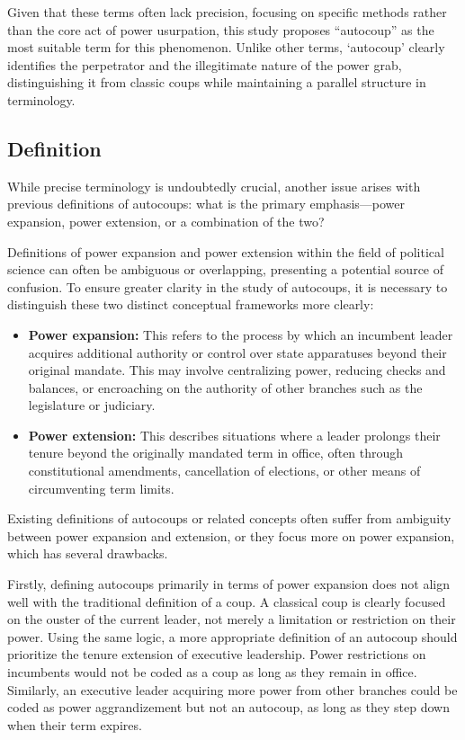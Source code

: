 \documentclass[
  12pt,
]{report}
\begin{document}
Given that these terms often lack precision, focusing on specific
methods rather than the core act of power usurpation, this study
proposes ``autocoup'' as the most suitable term for this phenomenon.
Unlike other terms, `autocoup' clearly identifies the perpetrator and
the illegitimate nature of the power grab, distinguishing it from
classic coups while maintaining a parallel structure in terminology.

\subsection{Definition}\label{definition}

While precise terminology is undoubtedly crucial, another issue arises
with previous definitions of autocoups: what is the primary
emphasis---power expansion, power extension, or a combination of the
two?

Definitions of power expansion and power extension within the field of
political science can often be ambiguous or overlapping, presenting a
potential source of confusion. To ensure greater clarity in the study of
autocoups, it is necessary to distinguish these two distinct conceptual
frameworks more clearly:

\begin{itemize}
\item
  \textbf{Power expansion:} This refers to the process by which an
  incumbent leader acquires additional authority or control over state
  apparatuses beyond their original mandate. This may involve
  centralizing power, reducing checks and balances, or encroaching on
  the authority of other branches such as the legislature or judiciary.
\item
  \textbf{Power extension:} This describes situations where a leader
  prolongs their tenure beyond the originally mandated term in office,
  often through constitutional amendments, cancellation of elections, or
  other means of circumventing term limits.
\end{itemize}

Existing definitions of autocoups or related concepts often suffer from
ambiguity between power expansion and extension, or they focus more on
power expansion, which has several drawbacks.

Firstly, defining autocoups primarily in terms of power expansion does
not align well with the traditional definition of a coup. A classical
coup is clearly focused on the ouster of the current leader, not merely
a limitation or restriction on their power. Using the same logic, a more
appropriate definition of an autocoup should prioritize the tenure
extension of executive leadership. Power restrictions on incumbents
would not be coded as a coup as long as they remain in office.
Similarly, an executive leader acquiring more power from other branches
could be coded as power aggrandizement but not an autocoup, as long as
they step down when their term expires.
\end{document}
